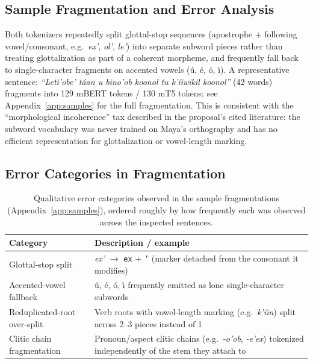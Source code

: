 \documentclass[11pt]{article}
\begin{document}
\subsection{Sample Fragmentation and Error Analysis}

Both tokenizers repeatedly split glottal-stop sequences (apostrophe +
following vowel/consonant, e.g.\ \textit{ex'}, \textit{ol'}, \textit{le'})
into separate subword pieces rather than treating glottalization as part of a
coherent morpheme, and frequently fall back to single-character fragments on
accented vowels (\'u, \'e, \'o, \'{\i}). A representative sentence:
\textit{``Leti'obe' t\'aan u bino'ob koonol tu k'\'iiwikil koonol''}
(42 words) fragments into 129 mBERT tokens / 130 mT5 tokens; see
Appendix~\ref{app:samples} for the full fragmentation. This is consistent
with the ``morphological incoherence'' tax described in the proposal's
cited literature: the subword vocabulary was never trained on Maya's
orthography and has no efficient representation for glottalization or
vowel-length marking.

\subsection{Error Categories in Fragmentation}
\label{sec:errorcats}

\begin{table}[h]
\centering
\small
\setlength{\tabcolsep}{3pt}
\begin{tabular}{p{2.6cm}p{4.6cm}}
\toprule
\textbf{Category} & \textbf{Description / example} \\
\midrule
Glottal-stop split & \textit{ex'} $\to$ \texttt{ex} + \texttt{'} (marker
  detached from the consonant it modifies) \\
Accented-vowel fallback & \'u, \'e, \'o, \'{\i} frequently emitted as lone
  single-character subwords \\
Reduplicated-root over-split & Verb roots with vowel-length marking (e.g.\
  \textit{k'\'iin}) split across 2--3 pieces instead of 1 \\
Clitic chain fragmentation & Pronoun/aspect clitic chains (e.g.\
  \textit{-o'ob}, \textit{-e'ex}) tokenized independently of the stem they
  attach to \\
\bottomrule
\end{tabular}
\caption{Qualitative error categories observed in the sample fragmentations
(Appendix~\ref{app:samples}), ordered roughly by how frequently each was
observed across the inspected sentences.}
\label{tab:errorcats}
\end{table}
\end{document}
